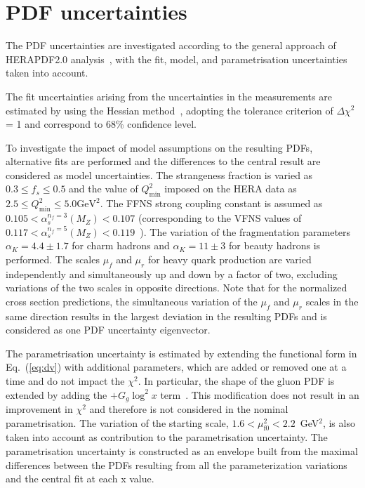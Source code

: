 \documentclass[12pt]{article}
\begin{document}
\section{PDF uncertainties}
\label{sec:pdfunc}

The PDF uncertainties are investigated according to the general approach of HERAPDF2.0 analysis~\cite{Abramowicz:2015mha}, with the fit, model, and parametrisation uncertainties taken into account.

The fit uncertainties arising from the uncertainties in the measurements are estimated by using the Hessian method~\cite{Pumplin:2001ct}, adopting the tolerance criterion of $\Delta \chi^2$ = 1 and correspond to 68\% confidence level.

To investigate the impact of model assumptions on the resulting PDFs, alternative fits are performed and the differences to the central result are considered as model uncertainties. The strangeness fraction is varied as $0.3 \leq f_{s} \leq 0.5$ and the value of $Q^2_{\text{min}}$ imposed on the HERA data as $2.5 \leq Q^2_\textrm{min}\leq 5.0\textrm{GeV}^2$. The FFNS strong coupling constant is assumed as $0.105 < \alpha_s^{n_f=3}(M_Z) < 0.107$ (corresponding to the VFNS values of $0.117 < \alpha_s^{n_f=5}(M_Z) < 0.119$~\cite{Tanabashi:2018oca}). The variation of the fragmentation parameters $\alpha_K = 4.4 \pm 1.7$ for charm hadrons and $\alpha_K = 11 \pm 3$ for beauty hadrons is performed.
The scales $\mu_f$ and $\mu_r$ for heavy quark production are varied independently and simultaneously up and down by a factor of two, excluding variations of the two scales in opposite directions. Note that for 
the normalized cross section predictions, the simultaneous variation of the $\mu_f$ and $\mu_r$ scales in the same direction results in the largest deviation in the 
resulting PDFs and is considered as one PDF uncertainty eigenvector.

The parametrisation uncertainty is estimated by extending the functional form in Eq.~(\ref{eq:dv}) with additional parameters, 
which are added or removed one at a time and do not impact the $\chi^2$. 
In particular, the shape of the gluon PDF is extended by adding the $+G_g\log^2 x$ term~\cite{Bonvini:2019wxf}. This modification does not result in an improvement in $\chi^2$ and therefore is not considered in the nominal parametrisation. 
The variation of the starting scale, $1.6 < \mu_\mathrm{f0}^2 < 2.2$~GeV$^2$, is also taken into account as contribution to the parametrisation uncertainty. The parametrisation uncertainty is constructed as an envelope built from the maximal differences between the PDFs resulting from all the parameterization variations and the central fit at each x value.
\end{document}

